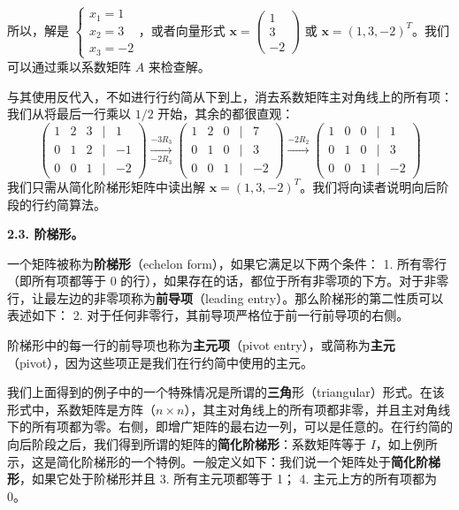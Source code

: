 所以，解是 $\begin{cases} x_1 = 1 \\ x_2 = 3 \\ x_3 = -2 \end{cases}$，或者向量形式 $\mathbf{x} = \begin{pmatrix} 1 \\ 3 \\ -2 \end{pmatrix}$ 或 $\mathbf{x} = (1, 3, -2)^T$。我们可以通过乘以系数矩阵 $A$ 来检查解。

与其使用反代入，不如进行行约简从下到上，消去系数矩阵主对角线上的所有项：我们从将最后一行乘以 $1/2$ 开始，其余的都很直观：
$$
\begin{pmatrix} 1 & 2 & 3 & | & 1 \\ 0 & 1 & 2 & | & -1 \\ 0 & 0 & 1 & | & -2 \end{pmatrix} \xrightarrow[-2R_3]{-3R_3} \begin{pmatrix} 1 & 2 & 0 & | & 7 \\ 0 & 1 & 0 & | & 3 \\ 0 & 0 & 1 & | & -2 \end{pmatrix} \xrightarrow{-2R_2} \begin{pmatrix} 1 & 0 & 0 & | & 1 \\ 0 & 1 & 0 & | & 3 \\ 0 & 0 & 1 & | & -2 \end{pmatrix}
$$
我们只需从简化阶梯形矩阵中读出解 $\mathbf{x} = (1, 3, -2)^T$。我们将向读者说明向后阶段的行约简算法。

\textbf{2.3. 阶梯形。}

一个矩阵被称为\textbf{阶梯形}（echelon form），如果它满足以下两个条件：
1. 所有零行（即所有项都等于 0 的行），如果存在的话，都位于所有非零项的下方。对于非零行，让最左边的非零项称为\textbf{前导项}（leading entry）。那么阶梯形的第二性质可以表述如下：
2. 对于任何非零行，其前导项严格位于前一行前导项的右侧。

阶梯形中的每一行的前导项也称为\textbf{主元项}（pivot entry），或简称为\textbf{主元}（pivot），因为这些项正是我们在行约简中使用的主元。

我们上面得到的例子中的一个特殊情况是所谓的\textbf{三角}形（triangular）形式。在该形式中，系数矩阵是方阵（$n \times n$），其主对角线上的所有项都非零，并且主对角线下的所有项都为零。右侧，即增广矩阵的最右边一列，可以是任意的。在行约简的向后阶段之后，我们得到所谓的矩阵的\textbf{简化阶梯形}：系数矩阵等于 $I$，如上例所示，这是简化阶梯形的一个特例。一般定义如下：我们说一个矩阵处于\textbf{简化阶梯形}，如果它处于阶梯形并且
3. 所有主元项都等于 1；
4. 主元上方的所有项都为 0。

